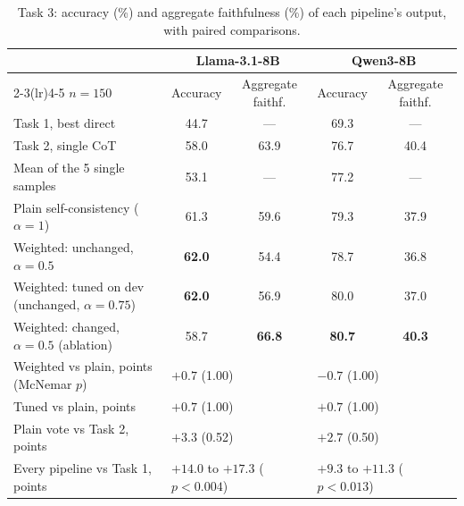 \documentclass[11pt,a4paper]{article}
\begin{document}
\begin{table}[h]
\centering\footnotesize
\begin{tabular}{@{}lcccc@{}}
\toprule
& \multicolumn{2}{c}{Llama-3.1-8B} & \multicolumn{2}{c}{Qwen3-8B} \\
\cmidrule(lr){2-3}\cmidrule(lr){4-5}
$n=150$ & Accuracy & Aggregate faithf. & Accuracy & Aggregate faithf. \\
\midrule
Task 1, best direct & 44.7 & --- & 69.3 & --- \\
Task 2, single CoT & 58.0 & 63.9 & 76.7 & 40.4 \\
Mean of the 5 single samples & 53.1 & --- & 77.2 & --- \\
Plain self-consistency ($\alpha=1$) & 61.3 & 59.6 & 79.3 & 37.9 \\
Weighted: unchanged, $\alpha=0.5$ & \textbf{62.0} & 54.4 & 78.7 & 36.8 \\
Weighted: tuned on dev (unchanged, $\alpha=0.75$) & \textbf{62.0} & 56.9 & 80.0 & 37.0 \\
Weighted: changed, $\alpha=0.5$ (ablation) & 58.7 & \textbf{66.8} & \textbf{80.7} & \textbf{40.3} \\
\midrule
Weighted vs plain, points (McNemar $p$) & \multicolumn{2}{l}{$+0.7$ (1.00)} & \multicolumn{2}{l}{$-0.7$ (1.00)} \\
Tuned vs plain, points & \multicolumn{2}{l}{$+0.7$ (1.00)} & \multicolumn{2}{l}{$+0.7$ (1.00)} \\
Plain vote vs Task 2, points & \multicolumn{2}{l}{$+3.3$ (0.52)} & \multicolumn{2}{l}{$+2.7$ (0.50)} \\
Every pipeline vs Task 1, points & \multicolumn{2}{l}{$+14.0$ to $+17.3$ ($p<0.004$)} & \multicolumn{2}{l}{$+9.3$ to $+11.3$ ($p<0.013$)} \\
\bottomrule
\end{tabular}
\caption{Task 3: accuracy (\%) and aggregate faithfulness (\%) of each pipeline's output, with paired comparisons.}
\label{tab:task3}
\end{table}
\end{document}
